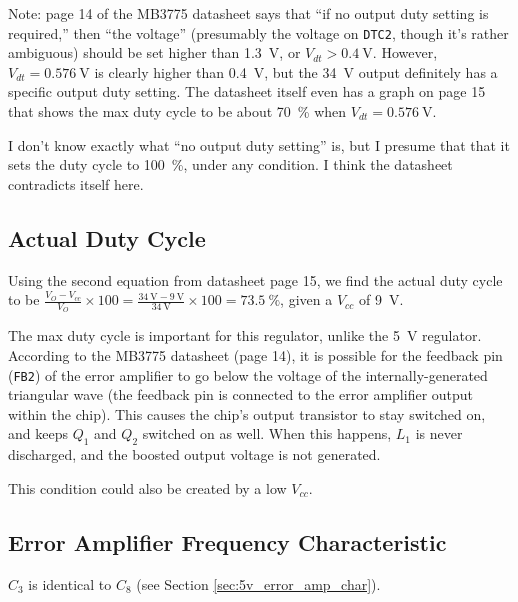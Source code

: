 \documentclass{article}
\newcommand{\Vcc}{$V_{cc}$}
\newcommand{\chippin}{\texttt}
\newcommand{\model}{\textsf}
\begin{document}
Note: page 14 of the \model{MB3775} datasheet says that ``if no output
duty setting is required,'' then ``the voltage'' (presumably the
voltage on \chippin{DTC2}, though it's rather ambiguous) should be set
higher than \qty{1.3}{\volt}, or $V_{dt} > \qty{0.4}{\volt}$. However,
$V_{dt} = \qty{0.576}{\volt}$ is clearly higher than \qty{0.4}{\volt},
but the \qty{34}{\volt} output definitely has a specific output duty
setting. The datasheet itself even has a graph on page 15 that shows
the max duty cycle to be about \qty{70}{\%} when
$V_{dt} = \qty{0.576}{\volt}$.

I don't know exactly what ``no output duty setting'' is, but I presume
that that it sets the duty cycle to \qty{100}{\%}, under any
condition. I think the datasheet contradicts itself here.

\subsection{Actual Duty Cycle}
\label{sec:34v_actual_duty_cycle}
Using the second equation from datasheet page 15, we find the actual
duty cycle to be
$\frac{V_O - V_{cc}}{V_O} \times{} 100 = \frac{\qty{34}{\volt} -
  \qty{9}{\volt}}{\qty{34}{\volt}} \times{} 100 = \qty{73.5}{\%}$,
given a \Vcc{} of \qty{9}{\volt}.



The max duty cycle is important for this regulator, unlike the
\qty{5}{\volt} regulator. According to the \model{MB3775} datasheet
(page 14), it is possible for the feedback pin (\chippin{FB2}) of the
error amplifier to go below the voltage of the internally-generated
triangular wave (the feedback pin is connected to the error amplifier
output within the chip). This causes the chip's output transistor to
stay switched on, and keeps $Q_1$ and $Q_2$ switched on as well. When
this happens, $L_1$ is never discharged, and the boosted output
voltage is not generated.

This condition could also be created by a low \Vcc{}.
\subsection{Error Amplifier Frequency Characteristic}
$C_3$ is identical to $C_8$ (see Section \ref{sec:5v_error_amp_char}).
\end{document}
